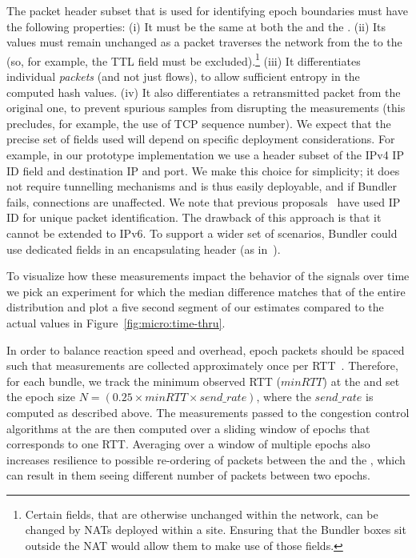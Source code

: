 The packet header subset that is used for identifying epoch boundaries must have the following properties:
(i) It must be the same at both the \inbox and the \outbox.
(ii) Its values must remain unchanged as a packet traverses the network from the \inbox to the \outbox (so, for example, the TTL field must be excluded).\footnote{Certain fields, that are otherwise unchanged within the network, can be changed by NATs deployed within a site. Ensuring that the Bundler boxes sit outside the NAT would allow them to make use of those fields.}
(iii) It differentiates individual \emph{packets} (and not just flows), to allow sufficient entropy in the computed hash values.
(iv) It also differentiates a retransmitted packet from the original one, to prevent spurious samples from disrupting the measurements (this precludes, for example, the use of TCP sequence number).
%
We expect that the precise set of fields used will depend on specific deployment considerations.
For example, in our prototype implementation we use a header subset of the IPv4 IP ID field and destination IP and port. 
We make this choice for simplicity; it does not require tunnelling mechanisms and is thus easily deployable, and if Bundler fails, connections are unaffected. 
We note that previous proposals~\cite{ip-traceback} have used IP ID for unique packet identification. 
The drawback of this approach is that it cannot be extended to IPv6.
To support a wider set of scenarios, Bundler could use dedicated fields in an encapsulating header (as in~\cite{axe}).

To visualize how these measurements impact the behavior of the signals over time we pick an experiment for which the median difference matches that of the entire distribution and plot a five second segment of our estimates compared to the actual values in Figure~\ref{fig:micro:time-thru}.



In order to balance reaction speed and overhead, epoch packets should be spaced such that measurements are collected approximately once per RTT~\cite{ccp}.
Therefore, for each bundle, we track the minimum observed RTT ($minRTT$) at the \inbox and set the epoch size $N = (0.25 \times minRTT \times send\_rate)$, where the $send\_rate$ is computed as described above. The measurements passed to the congestion control algorithms at the \inbox are then computed over a sliding window of epochs that corresponds to one RTT. Averaging over a window of multiple epochs also increases resilience to possible re-ordering of packets between the \inbox and the \outbox, which can result in them seeing different number of packets between two epochs.

